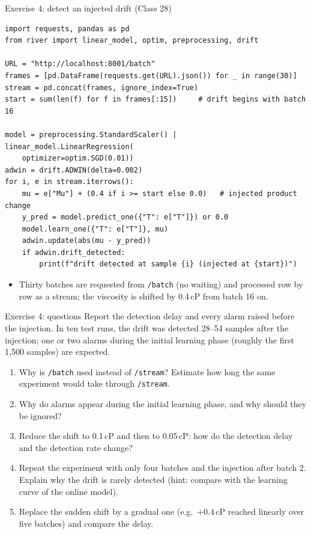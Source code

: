 \begin{frame}[fragile]{Exercise 4: detect an injected drift (Class 28)}
\begin{lstlisting}[style=coursepython, basicstyle=\ttfamily\scriptsize]
import requests, pandas as pd
from river import linear_model, optim, preprocessing, drift

URL = "http://localhost:8001/batch"
frames = [pd.DataFrame(requests.get(URL).json()) for _ in range(30)]
stream = pd.concat(frames, ignore_index=True)
start = sum(len(f) for f in frames[:15])     # drift begins with batch 16

model = preprocessing.StandardScaler() | linear_model.LinearRegression(
    optimizer=optim.SGD(0.01))
adwin = drift.ADWIN(delta=0.002)
for i, e in stream.iterrows():
    mu = e["Mu"] + (0.4 if i >= start else 0.0)   # injected product change
    y_pred = model.predict_one({"T": e["T"]}) or 0.0
    model.learn_one({"T": e["T"]}, mu)
    adwin.update(abs(mu - y_pred))
    if adwin.drift_detected:
        print(f"drift detected at sample {i} (injected at {start})")
\end{lstlisting}
\begin{itemize}\footnotesize
\item Thirty batches are requested from \texttt{/batch} (no waiting) and processed row by row as a stream; the viscosity is shifted by 0.4\,cP from batch 16 on.
\end{itemize}
\coursefooter
\end{frame}

\begin{frame}{Exercise 4: questions}
\begingroup\small
Report the detection delay and every alarm raised before the injection. In ten test runs, the drift was detected 28--54 samples after the injection; one or two alarms during the initial learning phase (roughly the first 1{,}500 samples) are expected.
\par\endgroup
\vspace{0.3em}
\begin{enumerate}\small
\item Why is \texttt{/batch} used instead of \texttt{/stream}? Estimate how long the same experiment would take through \texttt{/stream}.
\item Why do alarms appear during the initial learning phase, and why should they be ignored?
\item Reduce the shift to 0.1\,cP and then to 0.05\,cP: how do the detection delay and the detection rate change?
\item Repeat the experiment with only four batches and the injection after batch 2. Explain why the drift is rarely detected (hint: compare with the learning curve of the online model).
\item Replace the sudden shift by a gradual one (e.g.\ $+0.4\,$cP reached linearly over five batches) and compare the delay.
\end{enumerate}
\coursefooter
\end{frame}

